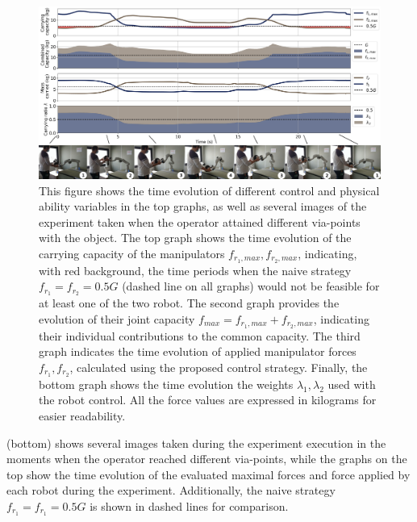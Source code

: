 \begin{landscape}
\begin{figure}
    \centering
    \includegraphics[width=\linewidth]{Papers/images/exp_no_anim.jpg}
    \caption{This figure shows the time evolution of different control and physical ability variables in the top graphs, as well as several images of the experiment taken when the operator attained different via-points with the object. 
   The top graph shows the time evolution of the carrying capacity of the manipulators $f_{r_1,max},f_{r_2,max}$, indicating, with red background, the time periods when the naive strategy $f_{r_1}=f_{r_2}=0.5G$ (dashed line on all graphs) would not be feasible for at least one of the two robot. 
   The second  graph provides the evolution of their joint capacity $f_{max}=f_{r_1,max}+f_{r_2,max}$, indicating their individual contributions to the common capacity. The third graph indicates the time evolution of applied manipulator forces $f_{r_1}, f_{r_2}$, calculated using the proposed control strategy. Finally, the bottom graph shows the time evolution the weights $\lambda_1,\lambda_2$ used with the robot control. All the force values are expressed in kilograms for easier readability.     
    }
    \label{fig:dual_manip}
\end{figure}
\end{landscape}

 (bottom) shows several images taken during the experiment execution in the moments when the operator reached different via-points, while the graphs on the top show the time evolution of the evaluated maximal forces and force applied by each robot during the experiment. Additionally, the naive strategy $f_{r_1}=f_{r_1}=0.5G$ is shown in dashed lines for comparison. 

